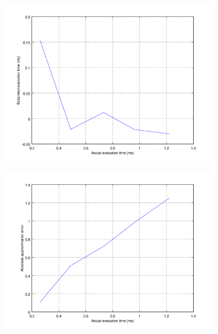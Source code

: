 \begin{figure}[ht!]
	\center
	\begin{subfigure}{0.6\linewidth}
	\center
	\includegraphics[width=\linewidth]{fig/lowtaest.png}
	\end{subfigure}
	\begin{subfigure}{0.45\linewidth}
	\center
	\includegraphics[width=\linewidth]{fig/lowabstaerr.png}
	\end{subfigure}
	\begin{subfigure}{0.45\linewidth}
	\center

\end{subfigure}
\end{figure}
